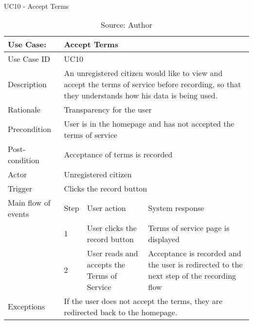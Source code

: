 \begin{table}[ht]
\centering
\caption{UC10 - Accept Terms}
\label{uc:10}
\begin{tabular}{|p{3cm}|p{1cm}|p{5cm}|p{5cm}|}
\hline
Use Case:       & \multicolumn{3}{p{11cm}|}{Accept Terms} \\ \hline
Use Case ID     & \multicolumn{3}{p{11cm}|}{UC10} \\ \hline
Description     & \multicolumn{3}{p{11cm}|}{An unregistered citizen would like to view and accept the terms of service before recording, so that they understands how his data is being used.} \\ \hline
Rationale       & \multicolumn{3}{p{11cm}|}{Transparency for the user} \\ \hline
Precondition    & \multicolumn{3}{p{11cm}|}{User is in the homepage and has not accepted the terms of service} \\ \hline
Post-condition  & \multicolumn{3}{p{11cm}|}{Acceptance of terms is recorded} \\ \hline
Actor           & \multicolumn{3}{p{11cm}|}{Unregistered citizen} \\ \hline
Trigger         & \multicolumn{3}{p{11cm}|}{Clicks the record button} \\ \hline
Main flow of events & Step  & User action & System response \\ \hline
                    & 1     & User clicks the record button & Terms of service page is displayed \\ \hline
                    & 2     & User reads and accepts the Terms of Service & Acceptance is recorded and the user is redirected to the next step of the recording flow \\ \hline
Exceptions      & \multicolumn{3}{p{11cm}|}{If the user does not accept the terms, they are redirected back to the homepage.} \\ \hline
\end{tabular}
\caption*{Source: Author}
\end{table}

